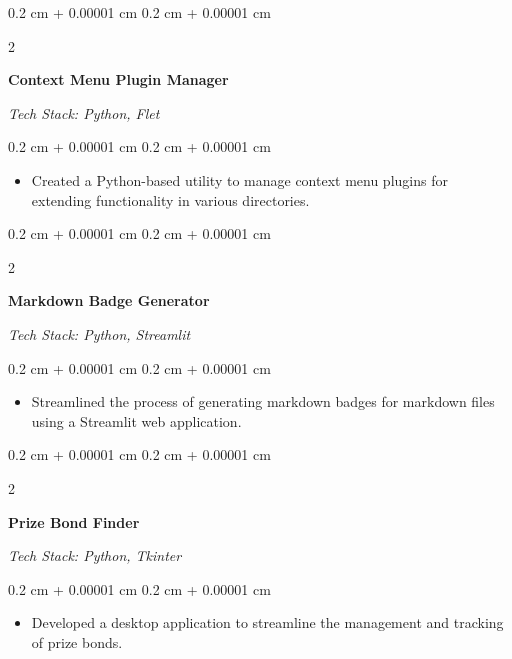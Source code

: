 \documentclass[10pt, a4paper]{article}
\newenvironment{highlights}{
    \begin{itemize}[
        topsep=0.1 cm,
        parsep=0.1 cm,
        partopsep=0pt,
        itemsep=0pt,
        leftmargin=0.4 cm + 10pt
    ]
}{
    \end{itemize}
} %
\newenvironment{onecolentry}{
    \begin{adjustwidth}{
        0.2 cm + 0.00001 cm
    }{
        0.2 cm + 0.00001 cm
    }
}{
    \end{adjustwidth}
} %
\newenvironment{twocolentry}[2][]{
    \onecolentry
    \def\secondColumn{#2}
    \begin{paracol}{2}
}{
    \switchcolumn \raggedleft \secondColumn
    \end{paracol}
    \endonecolentry
} %
\newcommand{\createpointblock}[5]{%
    \begin{twocolentry}{%
        \textit{#2}

        \textit{#4}}
        \textbf{#1}

        \textit{#3}
    \end{twocolentry}

    \vspace{0.1 cm}
    \begin{onecolentry}
        \begin{highlights}
            #5
        \end{highlights}
    \end{onecolentry}
}
\let\hrefWithoutArrow\href
\renewcommand{\href}[2]{\hrefWithoutArrow{#1}{\ifthenelse{\equal{#2}{}}{ }{#2 }\raisebox{.15ex}{\footnotesize \faExternalLink*}}}
\begin{document}
\vspace{0.2 cm}

\createpointblock{Context Menu Plugin Manager\href{https://github.com/abdbbdii/Context-Menu-Plugin-Manager}{}}{}
{Tech Stack: Python, Flet}{}
{%
	\item Created a Python-based utility to manage context menu plugins for extending functionality in various directories.
}

\vspace{0.2 cm}

\createpointblock{Markdown Badge Generator\href{https://github.com/abdbbdii/Markdown-badge-generator}{}}{}
{Tech Stack: Python, Streamlit}{}
{%
	\item Streamlined the process of generating markdown badges for markdown files using a Streamlit web application.
}

\vspace{0.2 cm}

\createpointblock{Prize Bond Finder\href{https://github.com/abdbbdii/prize-bond-finder}{}}{}
{Tech Stack: Python, Tkinter}{}
{%
	\item Developed a desktop application to streamline the management and tracking of prize bonds.
}






\end{document}

